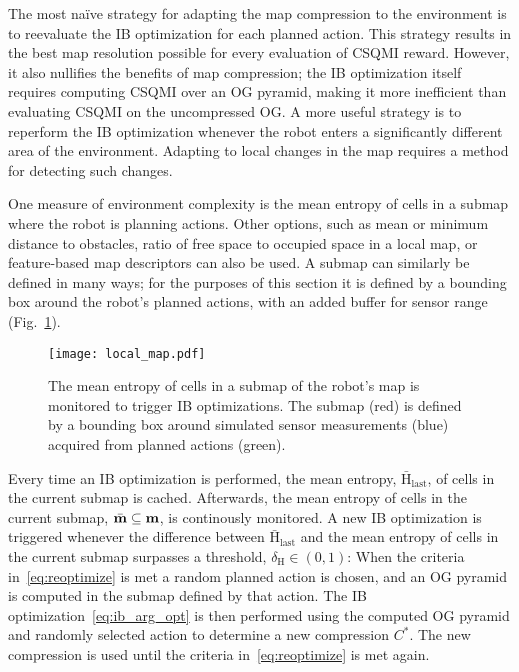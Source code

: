 The most na\"{i}ve strategy for adapting the map compression to the environment
is to reevaluate the IB optimization for each planned action. This
strategy results in the best map resolution possible for every evaluation of CSQMI
reward. However, it also nullifies the benefits of map compression;
the IB optimization itself requires computing CSQMI over an OG
pyramid, making it more inefficient than evaluating CSQMI on the uncompressed
OG. A more useful strategy is to reperform the IB optimization whenever the robot enters a significantly
different area of the environment. Adapting to local changes in
the map requires a method for detecting such changes.

One measure of environment complexity is the mean entropy of cells in a
submap where the robot is planning actions. Other options, such as mean or minimum distance to obstacles,
ratio of free space to occupied space in a local map, or feature-based
map descriptors can also be used. A submap can similarly be defined in many ways; for
the purposes of this section it is defined by a bounding box around the robot's
planned actions, with an added buffer for sensor range (Fig.~\ref{fig:local_map}).

\begin{figure}
  \centering
  \texttt{[image: local\_map.pdf]}
  \caption[A submap used for IB optimization.]{The mean entropy of cells in a
    submap of the robot's map is monitored to trigger IB optimizations. The submap (red) is defined by a bounding box
    around simulated sensor measurements (blue) acquired from planned actions
  (green). \label{fig:local_map}}
\end{figure}

Every time an IB optimization is performed, the mean entropy,
$\bar{\text{H}}_{\text{last}}$, of cells in the
current submap is cached. Afterwards, the mean entropy of cells in the current submap,
$\bar{\mathbf{m}} \subseteq \mathbf{m}$, is continously monitored. A new IB
optimization is triggered whenever the difference between
$\bar{\text{H}}_{\text{last}}$ and the mean entropy of cells in the current
submap surpasses a threshold, $\delta_{\text{H}} \in (0, 1)$:
%
%
When the criteria in~\eqref{eq:reoptimize} is met a random planned action is chosen,
and an OG pyramid is computed in the submap defined by that action. The IB optimization~\eqref{eq:ib_arg_opt}
is then performed using the computed OG pyramid and randomly selected action to
determine a new compression $C^{*}$. The new compression is
used until the criteria in~\eqref{eq:reoptimize} is met again.

